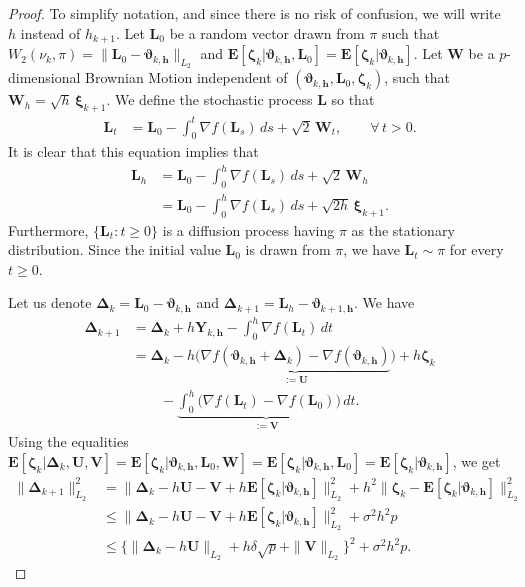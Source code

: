 \documentclass[aoap,preprint,reqno,a4paper]{imsart} %
\def\ds{\displaystyle}
\newcommand{\bzeta}{\boldsymbol{\zeta}}
\newcommand{\bvartheta}{\boldsymbol{\vartheta}}
\newcommand{\bDelta}{\boldsymbol{\Delta}}
\newcommand{\bxi}{\boldsymbol{\xi}}
\newcommand{\bfE}{\mathbf E}
\newcommand{\bh}{\boldsymbol h}
\newcommand{\bU}{\boldsymbol U}
\newcommand{\bV}{\boldsymbol V}
\newcommand{\bW}{\boldsymbol W\!}
\newcommand{\bL}{\boldsymbol L}
\newcommand{\bY}{\boldsymbol Y}
\begin{document}
\begin{proof}
To simplify notation, and since there is no risk of confusion,
we will write $h$ instead of $h_{k+1}$. Let $\bL_0$ be a random
vector drawn from $\pi$ such that
$W_2(\nu_k,\pi) = \|\bL_0-\bvartheta_{k,\bh}\|_{L_2}$ and $\bfE[\bzeta_{k}|\bvartheta_{k,\bh},\bL_0] =
\bfE[\bzeta_{k}|\bvartheta_{k,\bh}]$. Let $\bW$ be a
$p$-dimensional Brownian Motion independent of $(\bvartheta_{k,\bh}, \bL_0,\bzeta_{k})$,
such that $\bW_{h} = \sqrt{h}\,\bxi_{k+1}$. We define the stochastic process $\bL$
so that
\begin{align}\label{B}
\bL_t &= \bL_0 - \int_0^t  \nabla f(\bL_s)\,ds + \sqrt{2}\,\bW_t,\qquad\forall\, t>0.
\end{align}
It is clear that this equation implies that
\begin{align}
\ds\bL_{h}
	&= \bL_{0} - \int_{0}^{h} \nabla f(\bL_s)\,ds + \sqrt{2}\,\bW_{h}\\
	&= \bL_{0} - \int_{0}^{h} \nabla f(\bL_s)\,ds + \sqrt{2h}\,\bxi_{k+1}.
\end{align}
Furthermore, $\{\bL_t:t\ge 0\}$ is a diffusion process having $\pi$ as the stationary
distribution. Since the initial value $\bL_0$ is drawn from $\pi$, we have $\bL_t\sim \pi$
for every $t\ge 0$.

Let us denote $\bDelta_k = \bL_{0}-\bvartheta_{k,\bh}$ and
$\bDelta_{k+1} = \bL_{h}-\bvartheta_{k+1,\bh}$. We have
\begin{align}
\bDelta_{k+1}
	& = \bDelta_k  + h \bY_{k,\bh} - \int_0^h\nabla f(\bL_t)\,dt \\
	& = \bDelta_k  - h\big(\underbrace{\nabla f(\bvartheta_{k,\bh}+\bDelta_k)
			-\nabla f(\bvartheta_{k,\bh})}_{:=\bU}\big)+ h\bzeta_{k}\\
	&\qquad		-\underbrace{\int_0^h\big(\nabla f(\bL_t) - \nabla f(\bL_{0})\big)\,dt}_{:=\bV}.
\end{align}
Using the equalities
$\bfE[\bzeta_{k}|\bDelta_k,\bU,\bV] = \bfE[\bzeta_{k}|\bvartheta_{k,\bh},\bL_0,\bW] =
\bfE[\bzeta_{k}|\bvartheta_{k,\bh},\bL_0] = \bfE[\bzeta_{k}|\bvartheta_{k,\bh}]$, we get
\begin{align}
\|\bDelta_{k+1} \|_{L_2}^2
		&= \big\|\bDelta_k  -h \bU -\bV+h\bfE[\bzeta_{k}|\bvartheta_{k,\bh}]\big\|_{L_2}^2 +
		h^2\big\|\bzeta_{k}-\bfE[\bzeta_{k}|\bvartheta_{k,\bh}]\big\|_{L_2}^2\\
		&\le \big\|\bDelta_k  -h \bU -\bV+h\bfE[\bzeta_{k}|\bvartheta_{k,\bh}]\big\|_{L_2}^2 + \sigma^2 h^2 p\\
		&\le \big\{\|\bDelta_k  -h \bU\|_{L_2} +h\delta\sqrt{p} +\|\bV\|_{L_2}\big\}^2
			+ \sigma^2 h^2 p.\label{D}
\end{align}


\end{proof}
\end{document}
